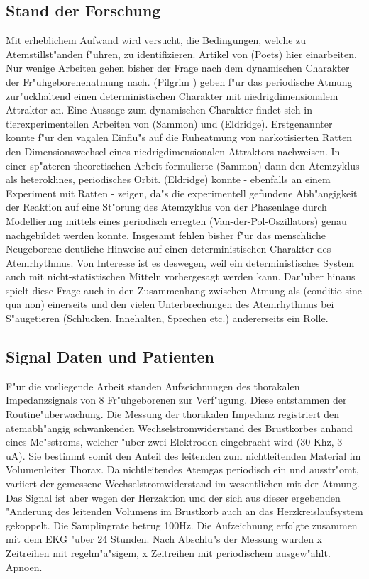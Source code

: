 \subsection{Stand der Forschung}

Mit erheblichem Aufwand wird versucht, die Bedingungen, welche zu Atemstillst"anden
f"uhren, zu identifizieren. Artikel von \autor(Poets) hier einarbeiten.  Nur wenige
Arbeiten gehen bisher der Frage nach dem dynamischen Charakter der Fr"uhgeborenenatmung
nach. \autor(Pilgrim \etal) geben f"ur das periodische Atmung zur"uckhaltend einen
deterministischen Charakter mit niedrigdimensionalem Attraktor an. Eine Aussage zum
dynamischen Charakter findet sich in tierexperimentellen Arbeiten von \autor(Sammon) und
\autor(Eldridge). Erstgenannter konnte f"ur den vagalen Einflu"s auf die Ruheatmung von
narkotisierten Ratten den Dimensionswechsel eines niedrigdimensionalen Attraktors
nachweisen. In einer sp"ateren theoretischen Arbeit formulierte \autor(Sammon) dann den
Atemzyklus als heteroklines, periodisches Orbit. \autor(Eldridge) konnte - ebenfalls an
einem Experiment mit Ratten - zeigen, da"s die experimentell gefundene Abh"angigkeit der
Reaktion auf eine St"orung des Atemzyklus von der Phasenlage durch Modellierung mittels
eines periodisch erregten \begriff(Van-der-Pol-Oszillators) genau nachgebildet werden
konnte.  Insgesamt fehlen bisher f"ur das menschliche Neugeborene deutliche Hinweise auf
einen deterministischen Charakter des Atemrhythmus. Von Interesse ist es deswegen, weil
ein deterministisches System auch mit nicht-statistischen Mitteln vorhergesagt werden
kann. Dar"uber hinaus spielt diese Frage auch in den Zusammenhang zwischen Atmung als
\begriff(conditio sine qua non) einerseits und den vielen Unterbrechungen des Atemrhythmus bei
S"augetieren (Schlucken, Innehalten, Sprechen etc.) andererseits ein Rolle.

\subsection{Signal Daten und Patienten}

F"ur die vorliegende Arbeit standen Aufzeichnungen des thorakalen Impedanzsignals von 8
Fr"uhgeborenen zur Verf"ugung. Diese entstammen der Routine"uberwachung. Die Messung der
thorakalen Impedanz registriert den atemabh"angig schwankenden Wechselstromwiderstand des
Brustkorbes anhand eines Me"sstroms, welcher "uber zwei Elektroden eingebracht wird (30 Khz,
3 uA). Sie bestimmt somit den Anteil des leitenden zum nichtleitenden Material im
Volumenleiter Thorax. Da nichtleitendes Atemgas periodisch ein und ausstr"omt, variiert
der gemessene Wechselstromwiderstand im wesentlichen mit der Atmung. Das Signal ist aber
wegen der Herzaktion und der sich aus dieser ergebenden "Anderung des leitenden Volumens im
Brustkorb auch an das Herzkreislaufsystem gekoppelt. Die Samplingrate betrug 100Hz. Die
Aufzeichnung erfolgte zusammen mit dem EKG "uber 24 Stunden. Nach Abschlu"s der Messung
wurden x Zeitreihen mit regelm"a"sigem, x Zeitreihen mit periodischem ausgew"ahlt. Apnoen.

